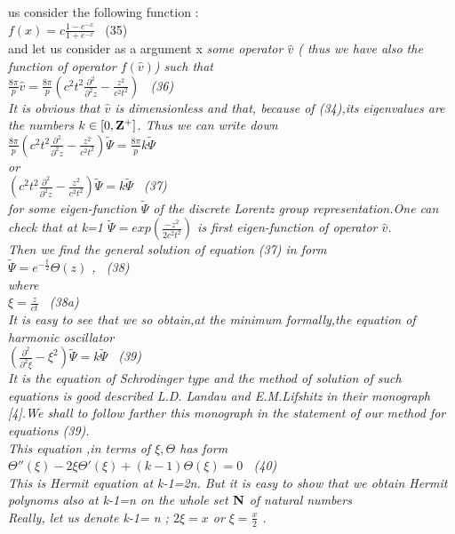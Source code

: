\documentclass[a4paper,12pt] {article}
\begin{document}
{us consider  the following function : \\$ f(x) = c \frac {1-e^{-x}}{1+e^{-x}}$  \ (35)\\ and let us  consider
 as a argument x  \it  some operator  $ \hat v $ \rm ( thus we have also \it the function of operator
$  f(\hat v)$) \rm  such that \\$  \frac{8\pi}{p} \hat v =
\frac {8\pi}{p} (c^2 t^2 \frac {\partial^2}{\partial^2 z}-\frac {z^2}{c^2 t^2} ) $ \ (36)\\ It is obvious that
 $\hat v$ is dimensionless and that, because of (34),its  eigenvalues  are the numbers $ k \in [0,\bf Z \rm ^+]$.
Thus we can write down \\$ \frac{8\pi}{p} (c^2 t^2 \frac{\partial^2}{\partial^2 z}-\frac {z^2}{c^2 t^2} ) \tilde \Psi =\frac{8\pi}{p} k \tilde \Psi $
\\or\\$ (c^2 t^2 \frac{\partial^2}{\partial^2 z}-\frac {z^2}{c^2 t^2} )  \tilde \Psi=k \tilde \Psi $  \ (37)
\\for some  eigen-function  $  \tilde \Psi $ of the discrete Lorentz group representation.One can check
that at k=1 $ \tilde \Psi =exp( \frac {-z^2}{2c^2t^2}) $ is \it first  eigen-function of operator $\hat v $.
\\ \rm  Then we find the general solution of equation (37) in form \\$ \tilde \Psi = e^{-\frac {\xi}{2}}
\Theta(z)$ , \ (38) \\where\\ $ \xi= \frac {z}{ct} $ \ (38a) \\ It is easy to see that we so obtain,at the
 minimum formally,\it the equation of  harmonic oscillator
 \\$ (\frac{\partial^2}{\partial^2 \xi}- \xi^2 )\tilde \Psi = k\tilde \Psi $  \rm \ (39) \\ It is the equation of
\it  Schrodinger type \rm and the method of solution of such equations is good described L.D. Landau
and E.M.Lifshitz in their monograph [4].We shall to follow farther this monograph in the statement of our
 method for equations (39).
\\This equation ,in terms of $\xi , \Theta $ has form
\\$ \Theta '' ( \xi)- 2\xi  \Theta '( \xi) +(k-1) \Theta ( \xi) =0 $ \ (40) \\ This is \it   Hermit  equation \rm at
 k-1=2n. But it is easy to show that \it we obtain Hermit polynoms also at \rm  k-1=n \it on the whole set
 $ \bf N$ \it of natural numbers \\ \rm Really, let us denote  k-1= n ; $ 2 \xi =x $ or $ \xi =\frac {x}{2} $ .
}
\end{document}
